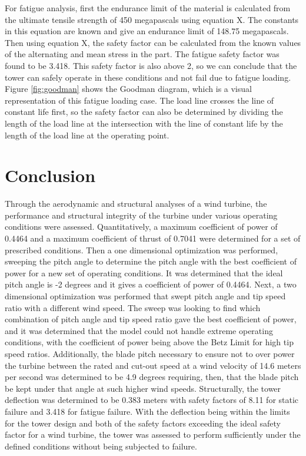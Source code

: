 \documentclass[11pt]{article}
\begin{document}
For fatigue analysis, first the endurance limit of the material is calculated from the ultimate tensile strength of 450 megapascals using equation X. The constants in this equation are known and give an endurance limit of 148.75 megapascals. Then using equation X, the safety factor can be calculated from the known values of the alternating and mean stress in the part. The fatigue safety factor was found to be 3.418. This safety factor is also above 2, so we can conclude that the tower can safely operate in these conditions and not fail due to fatigue loading. Figure \ref{fig:goodman} shows the Goodman diagram, which is a visual representation of this fatigue loading case. The load line crosses the line of constant life first, so the safety factor can also be determined by dividing the length of the load line at the intersection with the line of constant life by the length of the load line at the operating point. 

\section{Conclusion}
Through the aerodynamic and structural analyses of a wind turbine, the performance and structural integrity of the turbine under various operating conditions were assessed. Quantitatively, a maximum coefficient of power of 0.4464 and a maximum coefficient of thrust of 0.7041 were determined for a set of prescribed conditions. Then a one dimensional optimization was performed, sweeping the pitch angle to determine the pitch angle with the best coefficient of power for a new set of operating conditions. It was determined that the ideal pitch angle is -2 degrees and it gives a coefficient of power of 0.4464. Next, a two dimensional optimization was performed that swept pitch angle and tip speed ratio with a different wind speed. The sweep was looking to find which combination of pitch angle and tip speed ratio gave the best coefficient of power, and it was determined that the model could not handle extreme operating conditions, with the coefficient of power being above the Betz Limit for high tip speed ratios. Additionally, the blade pitch necessary to ensure not to over power the turbine between the rated and cut-out speed at a wind velocity of 14.6 meters per second was determined to be 4.9 degrees requiring, then, that the blade pitch be kept under that angle at such higher wind speeds. Structurally, the tower deflection was determined to be 0.383 meters with safety factors of 8.11 for static failure and 3.418 for fatigue failure. With the deflection being within the limits for the tower design and both of the safety factors exceeding the ideal safety factor for a wind turbine, the tower was assessed to perform sufficiently under the defined conditions without being subjected to failure. 
\end{document}
